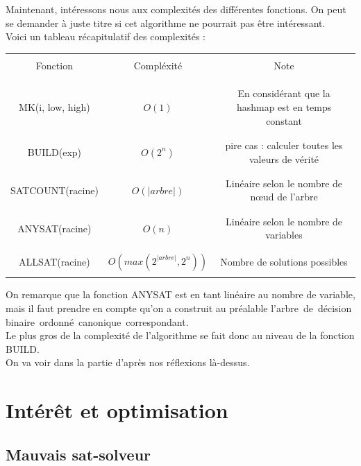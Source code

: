 \documentclass[a4paper, oneside]{report}
\newcommand{\adb}{arbre~de~décision binaire~}
\newcommand{\adbo}{\adb ordonné~}
\newcommand{\adboc}{\adbo canonique~}
\begin{document}
Maintenant, intéressons nous aux complexités des différentes fonctions. On peut se demander à juste titre si cet algorithme ne pourrait pas être intéressant.\\
Voici un tableau récapitulatif des complexités :\\
\begin{center}
\begin{tabular}{|c|c|c|}
\hline 
&&\\
Fonction & Compléxité & Note \\ 
&&\\
&&\\
\hline 
&&\\
MK(i, low, high) & $O(1)$ & En considérant que la hashmap est en temps constant \\ 
&&\\
\hline 
&&\\
BUILD(exp) & $O(2^n)$ & pire cas : calculer toutes les valeurs de vérité \\ 
&&\\
\hline 
&&\\
SATCOUNT(racine) & $O(|arbre|)$ & Linéaire selon le nombre de nœud de l'arbre \\ 
&&\\
\hline 
&&\\
ANYSAT(racine) & $O(n)$ & Linéaire selon le nombre de variables \\ 
&&\\
\hline 
&&\\
ALLSAT(racine) & $O(max(2^{|arbre|}, 2^n))$ & Nombre de solutions possibles \\ 
&&\\
\hline 
\end{tabular} 
\end{center}

On remarque que la fonction ANYSAT est en tant linéaire au nombre de variable, mais il faut prendre en compte qu'on a construit au préalable l'\adboc correspondant.\\
Le plus gros de la complexité de l'algorithme se fait donc au niveau de la fonction BUILD.\\
On va voir dans la partie d'après nos réflexions là-dessus.

\chapter{Intérêt et optimisation}

\section{Mauvais sat-solveur}
\end{document}
